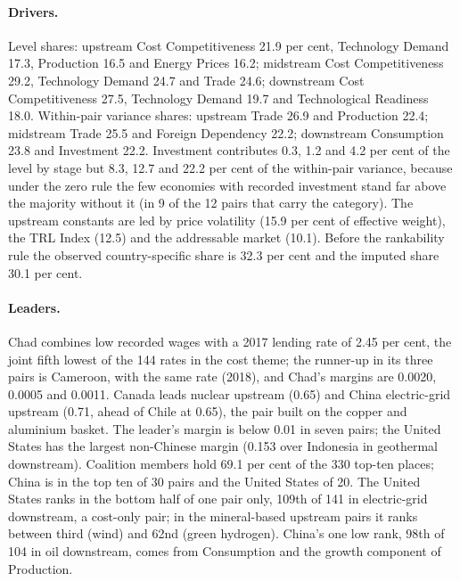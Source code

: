 \paragraph{Drivers.} Level shares: upstream Cost Competitiveness 21.9 per cent, Technology Demand
17.3, Production 16.5 and Energy Prices 16.2; midstream Cost Competitiveness 29.2, Technology Demand
24.7 and Trade 24.6; downstream Cost Competitiveness 27.5, Technology Demand 19.7 and Technological
Readiness 18.0. Within-pair variance shares: upstream Trade 26.9 and Production 22.4; midstream
Trade 25.5 and Foreign Dependency 22.2; downstream Consumption 23.8 and Investment 22.2. Investment
contributes 0.3, 1.2 and 4.2 per cent of the level by stage but 8.3, 12.7 and 22.2 per cent of the
within-pair variance, because under the zero rule the few economies with recorded investment stand
far above the majority without it (in 9 of the 12 pairs that carry the category). The upstream
constants are led by price volatility (15.9 per cent of effective weight), the TRL Index (12.5) and
the addressable market (10.1). Before the rankability rule the observed country-specific share is
32.3 per cent and the imputed share 30.1 per cent.

\paragraph{Leaders.} Chad combines low recorded wages with a 2017 lending rate of 2.45 per cent, the
joint fifth lowest of the 144 rates in the cost theme; the runner-up in its three pairs is Cameroon,
with the same rate (2018), and Chad's margins are 0.0020, 0.0005 and 0.0011. Canada leads nuclear
upstream (0.65) and China electric-grid upstream (0.71, ahead of Chile at 0.65), the pair built on
the copper and aluminium basket. The leader's margin is below 0.01 in seven pairs; the United States
has the largest non-Chinese margin (0.153 over Indonesia in geothermal downstream). Coalition
members hold 69.1 per cent of the 330 top-ten places; China is in the top ten of 30 pairs and the
United States of 20. The United States ranks in the bottom half of one pair only, 109th of 141 in
electric-grid downstream, a cost-only pair; in the mineral-based upstream pairs it ranks between
third (wind) and 62nd (green hydrogen). China's one low rank, 98th of 104 in oil downstream, comes
from Consumption and the growth component of Production.

